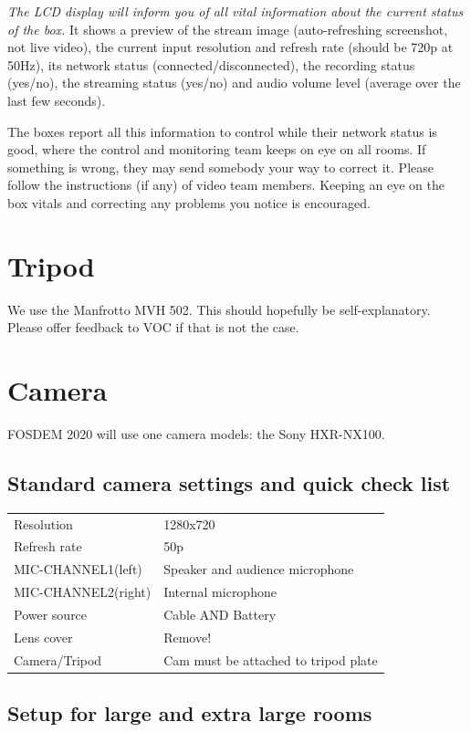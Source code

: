 \documentclass{article}
\begin{document}
\emph{The LCD display will inform you of all vital information about the current status of the box.} It shows a preview of the stream image (auto-refreshing screenshot, not live video), the current input resolution and refresh rate (should be 720p at 50Hz), its network status (connected/disconnected), the recording status (yes/no), the streaming status (yes/no) and audio volume level (average over the last few seconds).

The boxes report all this information to control while their network status is good, where the control and monitoring team keeps on eye on all rooms. If something is wrong, they may send somebody your way to correct it. Please follow the instructions (if any) of video team members. Keeping an eye on the box vitals and correcting any problems you notice is encouraged.

\section{Tripod}
We use the Manfrotto MVH 502. This should hopefully be self-explanatory. Please offer feedback to VOC if that is not the case.

\section{Camera}
FOSDEM 2020 will use one camera models: the Sony HXR-NX100.

\subsection{Standard camera settings and quick check list}
\begin{tabular}{| l | l |}
Resolution & 1280x720 \\
Refresh rate & 50p \\
MIC-CHANNEL1(left) &  Speaker and audience microphone \\
MIC-CHANNEL2(right) & Internal microphone \\
Power source & Cable AND Battery \\
Lens cover & Remove! \\
Camera/Tripod & Cam must be attached to tripod plate \\
\end{tabular}

\subsection{Setup for large and extra large rooms}
\end{document}
